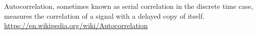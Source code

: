 \documentclass[varwidth,border=10pt]{standalone}
\begin{document}
Autocorrelation, sometimes known as serial correlation in the discrete time case, measures the correlation of a signal with a delayed copy of itself. \url{https://en.wikipedia.org/wiki/Autocorrelation}
\end{document}
